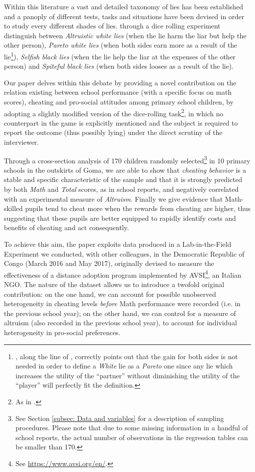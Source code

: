 \documentclass[authoryear, preprint, review, 12pt]{elsarticle}
\begin{document}
Within this literature a vast and detailed taxonomy of lies has been established and a panoply of different tests, tasks and situations have been devised in order to study every different shades of lies. \cite{erat2012white} through a dice rolling experiment distinguish between \textit{Altruistic white lies} (when the lie harm the liar but help the other person), \textit{Pareto white lies} (when both sides earn more as a result of the lie\footnote{\cite{maggian2016social}, along the line of \cite{g05}, correctly points out that the gain for both sides is not needed in order to define a \textit{White} lie as a \textit{Pareto} one since any lie which increases the utility of the \enquote{partner} without diminishing the utility of the \enquote{player} will perfectly fit the definition.}), \textit{Selfish black lies} (when the lie help the liar at the expenses of the other person) and \textit{Spiteful black lies} (when both sides looses as a result of the lie).

Our paper delves within this debate by providing a novel contribution on the relation existing between school performance (with a specific focus on math scores), cheating and pro-social attitudes among primary school children, by adopting a slightly modified version of the dice-rolling task\footnote{As in \cite{ariely2015true}.}, in which no counterpart in the game is explicitly mentioned and the subject is required to report the outcome (thus possibly lying) under the direct scrutiny of the interviewer. 

Through a cross-section analysis of 170 children randomly selected\footnote{See Section \ref{subsec: Data and variables} for a description of sampling procedures. Please note that due to some missing information in a handful of school reports, the actual number of observations in the regression tables can be smaller than 170.} in 10 primary schools in the outskirts of Goma, we are able to show that \textit{cheating behavior} is a stable and specific characteristic of the sample and that it is strongly predicted by both \textit{Math} and \textit{Total} scores, as in school reports, and negatively correlated with an experimental measure of \textit{Altruism}. Finally we give evidence that Math-skilled pupils tend to cheat more when the rewards from cheating are higher, thus suggesting that these pupils are better equipped to rapidly identify costs and benefits of cheating and act consequently.

To achieve this aim, the paper exploits data produced in a Lab-in-the-Field Experiment we conducted, with other colleagues, in the Democratic Republic of Congo (March 2016 and May 2017), originally devised to measure the effectiveness of a distance adoption program implemented by AVSI\footnote{See \url{https://www.avsi.org/en/}.}, an Italian NGO. The nature of the dataset allows us to introduce a twofold original contribution: on the one hand, we can account for possible unobserved heterogeneity in cheating levels \textit{before} Math performance were recorded (i.e. in the previous school year); on the other hand, we can control for a measure of altruism (also recorded in the previous school year), to account for individual heterogeneity in pro-social preferences.
\end{document}
